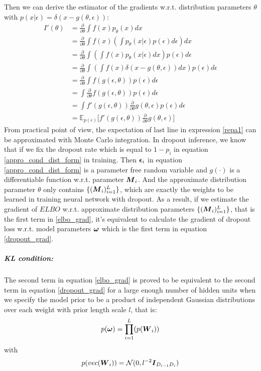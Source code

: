 Then we can derive the estimator of the gradients w.r.t. distribution parameters $\theta$ with $p(x|\epsilon) = \delta(x-g(\theta,\epsilon))$:
\begin{equation}
\begin{aligned} \label{repa1}
I'(\theta) &= \frac{\partial}{\partial \theta} \int f(x) p_{\theta}(x) dx \\
&= \frac{\partial}{\partial \theta} \int f(x)(\int p_{\theta}(x|\epsilon)p(\epsilon)d\epsilon) dx \\
&= \frac{\partial}{\partial \theta} \int (\int f(x) p_{\theta}(x|\epsilon)dx) p(\epsilon) d\epsilon \\
&= \frac{\partial}{\partial \theta} \int (\int f(x)\delta(x-g(\theta,\epsilon))dx) p(\epsilon) d\epsilon \\ 
&= \frac{\partial}{\partial \theta} \int f(g(\epsilon, \theta)) p(\epsilon) d\epsilon \\
&= \int \frac{\partial}{\partial \theta} f(g(\epsilon, \theta)) p(\epsilon) d\epsilon \\
&= \int f'(g(\epsilon, \theta))\frac{\partial}{\partial \theta}g(\theta, \epsilon) p(\epsilon) d\epsilon \\
&= \mathbb E_{p(\epsilon)}\big[ f'(g(\epsilon, \theta))\frac{\partial}{\partial \theta}g(\theta, \epsilon)\big] 
\end{aligned}
\end{equation} 
From practical point of view, the expectation of last line in expression \ref{repa1} can be approximated with Monte Carlo integration. In dropout inference, we know that if we fix the dropout rate which is equal to $1- p_{i}$ in equation \ref{appro_cond_dist_form} in training. Then $\boldsymbol \epsilon_{i}$ in equation \ref{appro_cond_dist_form} is a parameter free random variable and $g(\cdot)$ is a differentiable function w.r.t. parameter $\boldsymbol M_{i}$. And the approximate distribution parameter $\theta$ only contains $\{(\boldsymbol M_{i})_{i=1}^{L} \}$, which are exactly the weights to be learned in training neural network with dropout. As a result, if we estimate the gradient of $ELBO$ w.r.t. approximate distribution parameters $\{(\boldsymbol M_{i})_{i=1}^{L}\}$, that is the first term in \ref{elbo_grad}, it's equivalent to calculate the gradient of dropout loss w.r.t. model parameters $\boldsymbol \omega$ which is the first term in equation \ref{dropout_grad}.

\subparagraph{KL condition:} The second term in equation \ref{elbo_grad} is proved to be equivalent to the second term in equation \ref{dropout_grad}
for a large enough number of hidden units when we specify the model prior to be a product of independent Gaussian distributions over each weight with prior length scale $l$, that is:
\[p(\boldsymbol \omega) = \prod_{i=1}^{L}(p(\boldsymbol W_{i})) \]
with
\[
p(vec(\boldsymbol W_{i})) = \mathcal N(0, l^{-2}\boldsymbol I_{D_{i-1} D_{i}})
\]

